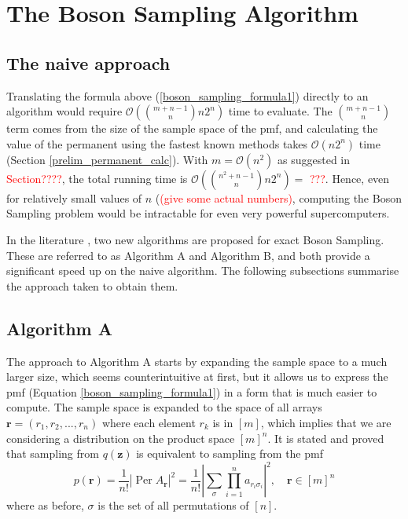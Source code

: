 \documentclass[11pt]{article}
\theoremstyle{theorem}
\theoremstyle{theorem}
\theoremstyle{remark}
\theoremstyle{note}
\theoremstyle{plain}
\theoremstyle{definition}
\DeclareMathOperator*{\Per}{\mathrm{Per}}
\begin{document}
\section{The Boson Sampling Algorithm}
\subsection{The naive approach}
Translating the formula above (\ref{boson_sampling_formula1}) directly to an algorithm would require $\mathcal{O}(\binom{m+n-1}{n} n 2^n)$ time to evaluate. The $\binom{m+n-1}{n}$ term comes from the size of the sample space of the pmf, and calculating the value of the permanent using the fastest known methods takes $\mathcal{O}(n 2^n)$ time (Section \ref{prelim_permanent_calc}). With $m = \mathcal{O}(n^2)$ as suggested in \textcolor{red}{Section????}, the total running time is $\mathcal{O}(\binom{n^2+n-1}{n} n 2^n) = $ \textcolor{red}{???}. Hence, even for relatively small values of $n$ (\textcolor{red}{(give some actual numbers)}, computing the Boson Sampling problem would be intractable for even very powerful supercomputers.

In the literature \cite{clifford17}, two new algorithms are proposed for exact Boson Sampling. These are referred to as Algorithm A and Algorithm B, and both provide a significant speed up on the naive algorithm. The following subsections summarise the approach taken to obtain them.

\subsection{Algorithm A}
The approach to Algorithm A starts by expanding the sample space to a much larger size, which seems counterintuitive at first, but it allows us to express the pmf (Equation \ref{boson_sampling_formula1}) in a form that is much easier to compute. The sample space is expanded to the space of all arrays $\mathbf{r}=(r_1, r_2, ... , r_n)$ where each element $r_k$ is in $[m]$, which implies that we are considering a distribution on the product space $[m]^n$. It is stated and proved that sampling from $q(\mathbf{z})$ is equivalent to sampling from the pmf
\begin{equation} \label{eqn:algADistribution}
p(\mathbf{r}) = \frac{1}{n!} \left| \Per A_\mathbf{r} \right| ^2 = \frac{1}{n!} \left| \sum_\sigma \prod_{i=1}^n a_{r_i \sigma_i} \right| ^2 , \quad \mathbf{r} \in [m]^n 
\end{equation}
where as before, $\sigma$ is the set of all permutations of $[n]$.
\end{document}
